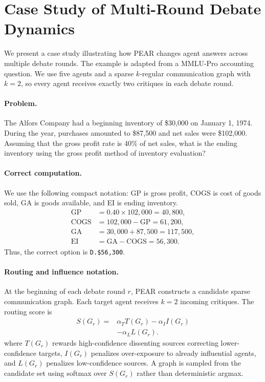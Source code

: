 
\section{Case Study of Multi-Round Debate Dynamics}
\label{app:case_study}

We present a case study illustrating how PEAR changes agent answers across multiple debate rounds. The example is adapted from a MMLU-Pro accounting question. We use five agents and a sparse $k$-regular communication graph with $k=2$, so every agent receives exactly two critiques in each debate round.

\paragraph{Problem.}
The Alfors Company had a beginning inventory of \$30,000 on January 1, 1974. During the year, purchases amounted to \$87,500 and net sales were \$102,000. Assuming that the gross profit rate is 40\% of net sales, what is the ending inventory using the gross profit method of inventory evaluation?

\paragraph{Correct computation.}
We use the following compact notation: GP is gross profit, COGS is cost of goods sold, GA is goods available, and EI is ending inventory.
\[
\begin{aligned}
\mathrm{GP} &= 0.40\times102{,}000 = 40{,}800,\\
\mathrm{COGS} &= 102{,}000-\mathrm{GP} = 61{,}200,\\
\mathrm{GA} &= 30{,}000+87{,}500 = 117{,}500,\\
\mathrm{EI} &= \mathrm{GA}-\mathrm{COGS} = 56{,}300.
\end{aligned}
\]
Thus, the correct option is \texttt{D.\$56,300}.

\paragraph{Routing and influence notation.}
At the beginning of each debate round $r$, PEAR constructs a candidate sparse communication graph. Each target agent receives $k=2$ incoming critiques. The routing score is
\[
\begin{aligned}
S(G_r)={}&\alpha_T T(G_r)-\alpha_I I(G_r)\\
&-\alpha_L L(G_r).
\end{aligned}
\]
where $T(G_r)$ rewards high-confidence dissenting sources correcting lower-confidence targets, $I(G_r)$ penalizes over-exposure to already influential agents, and $L(G_r)$ penalizes low-confidence sources. A graph is sampled from the candidate set using softmax over $S(G_r)$ rather than deterministic argmax.

